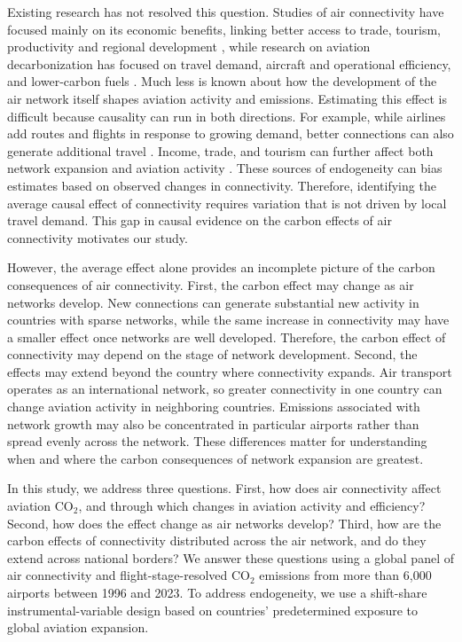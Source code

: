 \documentclass[12pt]{extarticle}
\begin{document}
Existing research has not resolved this question. Studies of air
connectivity have focused mainly on its economic benefits, linking better
access to trade, tourism, productivity and regional development
\citep{lenaerts2021,zhang2020}, while research on aviation
decarbonization has focused on travel demand, aircraft and operational
efficiency, and lower-carbon fuels \citep{bergero2023,dray2022}. Much
less is known about how the development of the air network itself shapes
aviation activity and emissions. Estimating this effect is difficult
because causality can run in both directions. For example, while airlines
add routes and flights in response to growing demand, better connections
can also generate additional travel \citep{koo2017,pitfield2010}. Income,
trade, and tourism can further affect both network expansion and aviation
activity \citep{vandevijver2014}. These sources of endogeneity can bias
estimates based on observed changes in connectivity. Therefore,
identifying the average causal effect of connectivity requires variation
that is not driven by local travel demand. This gap in causal evidence on
the carbon effects of air connectivity motivates our study.

However, the average effect alone provides an incomplete picture of the
carbon consequences of air connectivity. First, the carbon effect may
change as air networks develop. New connections can generate substantial
new activity in countries with sparse networks, while the same increase in
connectivity may have a smaller effect once networks are well developed.
Therefore, the carbon effect of connectivity may depend on the stage of
network development. Second, the effects may extend beyond the country
where connectivity expands. Air transport operates as an international
network, so greater connectivity in one country can change aviation
activity in neighboring countries. Emissions associated with network
growth may also be concentrated in particular airports rather than spread
evenly across the network. These differences matter for understanding
when and where the carbon consequences of network expansion are greatest.

In this study, we address three questions. First, how does air
connectivity affect aviation CO$_2$, and through which changes in
aviation activity and efficiency? Second, how does the effect change as
air networks develop? Third, how are the carbon effects of connectivity
distributed across the air network, and do they extend across national
borders? We answer these questions using a global panel of air
connectivity and flight-stage-resolved CO$_2$ emissions from more than
6{,}000 airports between 1996 and 2023. To address endogeneity, we use a
shift-share instrumental-variable design based on countries'
predetermined exposure to global aviation expansion.
\end{document}
